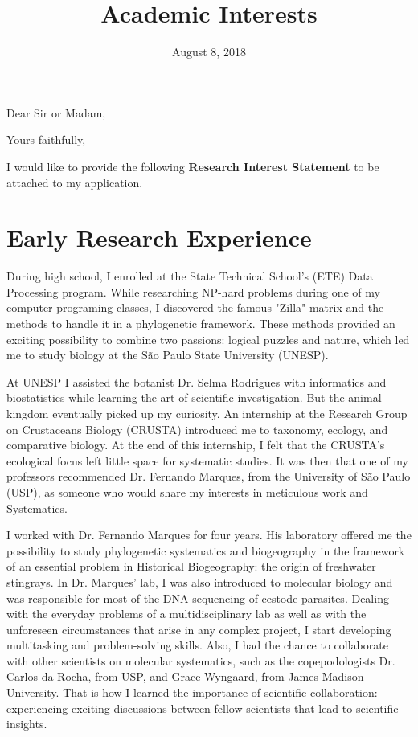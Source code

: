 \documentclass[12pt, a4paper, roman, twoside]{moderncv}        %
\title{Academic Interests}                               %
\begin{document}
\thispagestyle{empty} %
    \date{August 8, 2018}
    \opening{Dear Sir or Madam,}
    \closing{Yours faithfully,}
\makelettertitle
%
\justifying
%
    I would like to provide the following \textbf{Research Interest Statement} to be attached to my application.
%
\section*{Early Research Experience}{\setlength{\parindent}{5ex}
	During high school, I enrolled at the State Technical School's (ETE) Data Processing program. While researching NP-hard problems during one of my computer programing classes, I discovered the famous "Zilla" matrix and the methods to handle it in a phylogenetic framework. These methods provided an exciting possibility to combine two passions: logical puzzles and nature, which led me to study biology at the São Paulo State University (UNESP).
	
	At UNESP I assisted the botanist Dr. Selma Rodrigues with informatics and biostatistics while learning the art of scientific investigation. But the animal kingdom eventually picked up my curiosity. An internship at the Research Group on Crustaceans Biology (CRUSTA) introduced me to taxonomy, ecology, and comparative biology. At the end of this internship, I felt that the CRUSTA's ecological focus left little space for systematic studies. It was then that one of my professors recommended Dr. Fernando Marques, from the University of São Paulo (USP), as someone who would share my interests in meticulous work and Systematics.
	
	I worked with Dr. Fernando Marques for four years. His laboratory offered me the possibility to study phylogenetic systematics and biogeography in the framework of an essential problem in Historical Biogeography: the origin of freshwater stingrays. In Dr. Marques' lab, I was also introduced to molecular biology and was responsible for most of the DNA sequencing of cestode parasites. Dealing with the everyday problems of a multidisciplinary lab as well as with the unforeseen circumstances that arise in any complex project, I start developing multitasking and problem-solving skills. Also, I had the chance to collaborate with other scientists on molecular systematics, such as the copepodologists Dr. Carlos da Rocha, from USP, and Grace Wyngaard, from James Madison University. That is how I learned the importance of scientific collaboration: experiencing exciting discussions between fellow scientists that lead to scientific insights.
	
}
\end{document}
